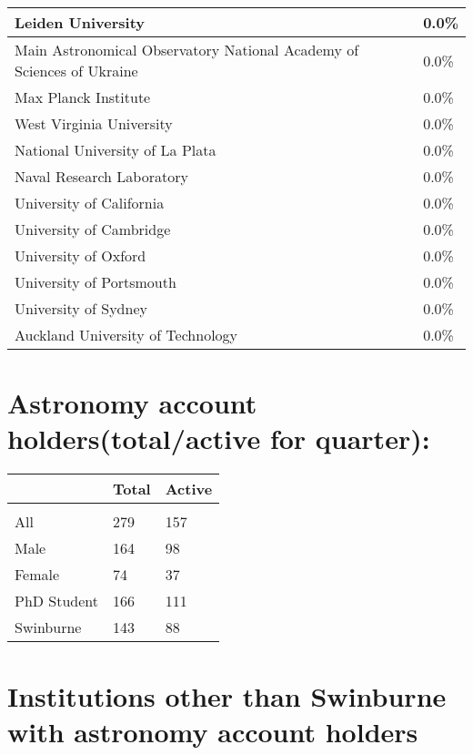 \documentclass{article}%
\begin{document}
\begin{longtabu}{X[l] X[r]}
\hline%
Leiden University&0.0\%\\%
\hline%
Main Astronomical Observatory National Academy of Sciences of Ukraine&0.0\%\\%
\hline%
Max Planck Institute&0.0\%\\%
\hline%
West Virginia University&0.0\%\\%
\hline%
National University of La Plata&0.0\%\\%
\hline%
Naval Research Laboratory&0.0\%\\%
\hline%
University of California&0.0\%\\%
\hline%
University of Cambridge&0.0\%\\%
\hline%
University of Oxford&0.0\%\\%
\hline%
University of Portsmouth&0.0\%\\%
\hline%
University of Sydney&0.0\%\\%
\hline%
Auckland University of Technology&0.0\%\\%
\hline%
\end{longtabu}%
\section{Astronomy account holders(total/active for quarter): }%

%
\begin{longtabu}{X[l] X[r] X[r]}%
\textbf{}&\textbf{Total}&\textbf{Active}\\%
\hline%
&&\\%
All&279&157\\%
\hline%
Male&164&98\\%
\hline%
Female&74&37\\%
\hline%
PhD Student&166&111\\%
\hline%
Swinburne&143&88\\%
\hline%
\end{longtabu}%
\section{Institutions other than Swinburne with astronomy account holders}%
\end{document}
